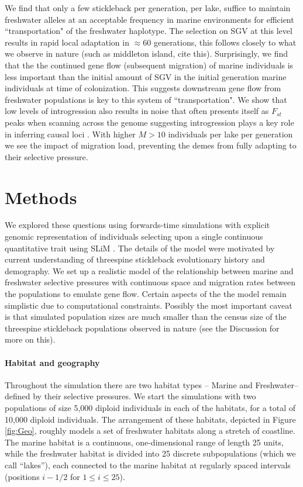 \documentclass{article}
\begin{document}
We find that only a few stickleback per generation, per lake, suffice to maintain freshwater alleles at an acceptable frequency in marine environments for efficient ``transportation" of the freshwater haplotype.
The selection on SGV at this level results in rapid local adaptation in $\approx 60$ generations, this follows closely to what we observe in nature (such as middleton island, cite this).
Surprisingly, we find that the the continued gene flow (subsequent migration) of marine individuals is less important than the initial amount of SGV in the initial generation marine individuals at time of colonization.
This suggests downstream gene flow from freshwater populations is key to this system of ``transportation".
We show that low levels of introgression also results in noise that often presents itself as $F_{st}$ peaks when scanning across the genome suggesting introgression plays a key role in inferring causal loci . 
With higher $M > 10$ individuals per lake per generation we see the impact of migration load, preventing the demes from fully adapting to their selective pressure.

\section*{Methods}

We explored these questions using forwards-time simulations with explicit genomic representation of individuals selecting upon a single continuous quantitative trait using SLiM \citep{haller2017slim,haller2018slim3}.
The details of the model were motivated by current understanding of threespine stickleback evolutionary history and demography.
We set up a realistic model of the relationship between marine and freshwater selective pressures with continuous space and migration rates between the populations to emulate gene flow. 
Certain aspects of the the model remain simplistic due to computational constraints.
Possibly the most important caveat is that simulated population sizes are much smaller than the census size of the threespine stickleback populations observed in nature
(see the Discussion for more on this).

\paragraph{Habitat and geography}
Throughout the simulation there are two habitat types -- Marine and Freshwater-- defined by their selective pressures.
We start the simulations with two populations of size 5,000 diploid individuals in each of the habitats, for a total of 10,000 diploid individuals.
The arrangement of these habitats, depicted in Figure \ref{fig:Geo},
roughly models a set of freshwater habitats along a stretch of coastline. 
The marine habitat is a continuous, one-dimensional range of length 25 units,
while the freshwater habitat is divided into 25 discrete subpopulations (which we call ``lakes''),
each connected to the marine habitat at regularly spaced intervals
(positions $i - 1/2$ for $1 \le i \le 25$).
\end{document}
